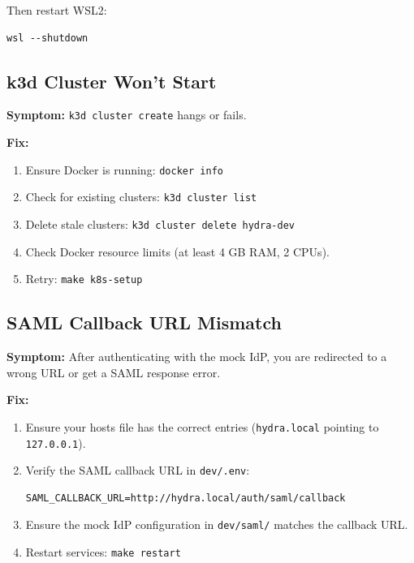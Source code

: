 \documentclass[11pt,a4paper]{article}
\newcommand{\cmdref}[1]{\texttt{#1}}
\begin{document}
Then restart WSL2:

\begin{lstlisting}[style=bash]
wsl --shutdown
\end{lstlisting}

\subsection{k3d Cluster Won't Start}

\textbf{Symptom:} \cmdref{k3d cluster create} hangs or fails.

\textbf{Fix:}

\begin{enumerate}[leftmargin=2em]
    \item Ensure Docker is running: \cmdref{docker info}
    \item Check for existing clusters: \cmdref{k3d cluster list}
    \item Delete stale clusters: \cmdref{k3d cluster delete hydra-dev}
    \item Check Docker resource limits (at least 4 GB RAM, 2 CPUs).
    \item Retry: \cmdref{make k8s-setup}
\end{enumerate}

\subsection{SAML Callback URL Mismatch}

\textbf{Symptom:} After authenticating with the mock IdP, you are
redirected to a wrong URL or get a SAML response error.

\textbf{Fix:}

\begin{enumerate}[leftmargin=2em]
    \item Ensure your hosts file has the correct entries
          (\cmdref{hydra.local} pointing to \cmdref{127.0.0.1}).
    \item Verify the SAML callback URL in \cmdref{dev/.env}:
\begin{lstlisting}[style=bash]
SAML_CALLBACK_URL=http://hydra.local/auth/saml/callback
\end{lstlisting}
    \item Ensure the mock IdP configuration in
          \cmdref{dev/saml/} matches the callback URL.
    \item Restart services: \cmdref{make restart}
\end{enumerate}
\end{document}
